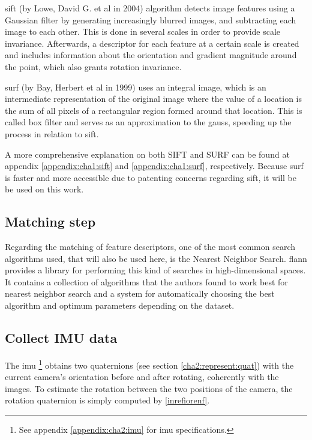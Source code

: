 \acrshort{sift} (by Lowe, David G. et al in 2004) \cite{sift} algorithm detects image features using a Gaussian filter by generating increasingly blurred images, and subtracting each image to each other. This is done in several scales in order to provide scale invariance. Afterwards, a descriptor for each feature at a certain scale is created and includes information about the orientation and gradient magnitude around the point, which also grants rotation invariance.

\acrshort{surf} (by Bay, Herbert et al in 1999) \cite{surf} uses an integral image, which is an intermediate representation of the original image where the value of a location is the sum of all pixels of a rectangular region formed around that location. This is called box filter and serves as an approximation to the \gls{gauss}, speeding up the process in relation to \acrshort{sift}.

A more comprehensive explanation on both SIFT and SURF can be found at appendix \ref{appendix:cha1:sift} and \ref{appendix:cha1:surf}, respectively. Because \acrshort{surf} is faster and more accessible due to patenting concerns regarding \acrshort{sift}, it will be be used on this work.

\subsection{Matching step}
Regarding the matching of feature descriptors, one of the most common search algorithms used, that will also be used here, is the Nearest Neighbor Search. \acrfull{flann} \cite{flann} provides a library for performing this kind of searches in high-dimensional spaces. It contains a collection of algorithms that the authors found to  work best for nearest neighbor search and a system for automatically choosing the best algorithm and optimum parameters depending on the dataset.

\subsection{Collect IMU data}
The \acrlong{imu} \footnote{See appendix \ref{appendix:cha2:imu} for \acrshort{imu} specifications.} obtains two quaternions (see section \ref{cha2:represent:quat}) with the current camera's orientation before and after rotating, coherently with the images. To estimate the rotation between the two positions of the camera, the rotation quaternion is simply computed by \ref{inrefiorenf}. 

